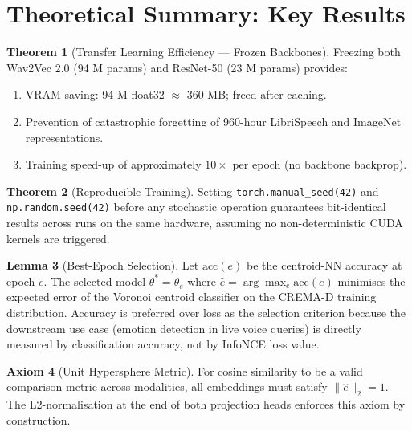 \documentclass[12pt,a4paper]{article}
\theoremstyle{definition}
\newtheorem{theorem}{Theorem}[section]
\newtheorem{lemma}[theorem]{Lemma}
\newtheorem{axiom}[theorem]{Axiom}
\theoremstyle{remark}
\begin{document}
\section{Theoretical Summary: Key Results}

\begin{theorem}[Transfer Learning Efficiency — Frozen Backbones]
Freezing both Wav2Vec 2.0 (94 M params) and ResNet-50 (23 M params) provides:
\begin{enumerate}
  \item VRAM saving: 94 M float32 $\approx$ 360 MB; freed after caching.
  \item Prevention of catastrophic forgetting of 960-hour LibriSpeech and
        ImageNet representations.
  \item Training speed-up of approximately $10\times$ per epoch (no backbone backprop).
\end{enumerate}
\end{theorem}

\begin{theorem}[Reproducible Training]
Setting \texttt{torch.manual\_seed(42)} and \texttt{np.random.seed(42)}
before any stochastic operation guarantees bit-identical results across runs
on the same hardware, assuming no non-deterministic CUDA kernels are triggered.
\end{theorem}

\begin{lemma}[Best-Epoch Selection]
Let $\text{acc}(e)$ be the centroid-NN accuracy at epoch $e$.
The selected model $\theta^* = \theta_{\hat{e}}$ where
$\hat{e} = \arg\max_e \text{acc}(e)$ minimises the expected error
of the Voronoi centroid classifier on the CREMA-D training distribution.
Accuracy is preferred over loss as the selection criterion because
the downstream use case (emotion detection in live voice queries) is
directly measured by classification accuracy, not by InfoNCE loss value.
\end{lemma}

\begin{axiom}[Unit Hypersphere Metric]
For cosine similarity to be a valid comparison metric across modalities,
all embeddings must satisfy $\|\hat{e}\|_2 = 1$. The L2-normalisation
at the end of both projection heads enforces this axiom by construction.
\end{axiom}

\appendix
\end{document}
